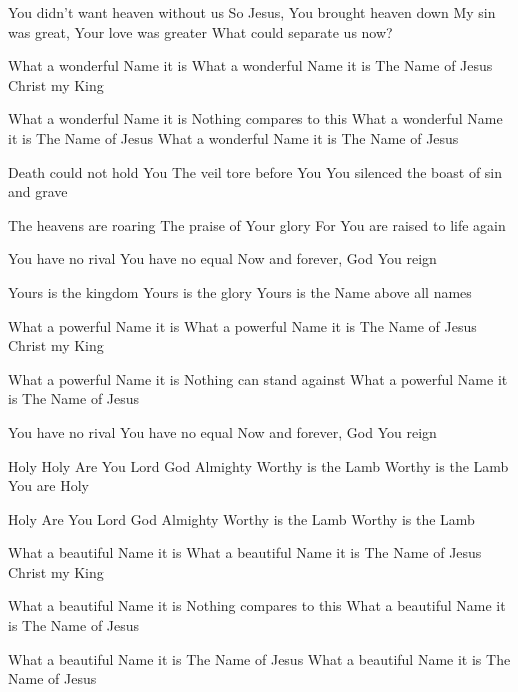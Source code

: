 You didn't want heaven without us
So Jesus, You brought heaven down
My sin was great, Your love was greater
What could separate us now?

What a wonderful Name it is
What a wonderful Name it is
The Name of Jesus Christ my King 

What a wonderful Name it is
Nothing compares to this
What a wonderful Name it is
The Name of Jesus
What a wonderful Name it is
The Name of Jesus 

Death could not hold You
The veil tore before You
You silenced the boast of sin and grave

The heavens are roaring
The praise of Your glory
For You are raised to life again

You have no rival
You have no equal
Now and forever, God You reign

Yours is the kingdom
Yours is the glory
Yours is the Name above all names

What a powerful Name it is
What a powerful Name it is
The Name of Jesus Christ my King

What a powerful Name it is
Nothing can stand against
What a powerful Name it is
The Name of Jesus

You have no rival
You have no equal
Now and forever, God You reign

\endverse

\beginchorus

Holy Holy
Are You Lord God Almighty
Worthy is the Lamb
Worthy is the Lamb
You are Holy

Holy
Are You Lord God Almighty
Worthy is the Lamb
Worthy is the Lamb

\endchorus


\beginverse

What a beautiful Name it is
What a beautiful Name it is
The Name of Jesus Christ my King

What a beautiful Name it is
Nothing compares to this
What a beautiful Name it is
The Name of Jesus

What a beautiful Name it is
The Name of Jesus
What a beautiful Name it is
The Name of Jesus

\endverse

\endsong
